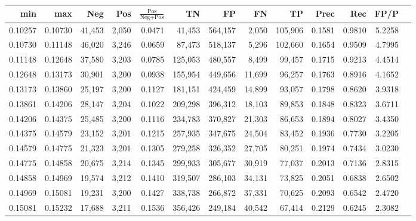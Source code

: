 \begin{tabular}{rrrrrrrrrrrrr}
\toprule
    min &     max &    Neg &   Pos & $\frac{\text{Pos}}{\text{Neg}+\text{Pos}}$ &      TN &      FP &      FN &      TP &   Prec &    Rec &   FP/P \\
\midrule
0.10257 & 0.10730 & 41,453 & 2,050 &                                     0.0471 &  41,453 & 564,157 &   2,050 & 105,906 & 0.1581 & 0.9810 & 5.2258 \\
0.10730 & 0.11148 & 46,020 & 3,246 &                                     0.0659 &  87,473 & 518,137 &   5,296 & 102,660 & 0.1654 & 0.9509 & 4.7995 \\
0.11148 & 0.12648 & 37,580 & 3,203 &                                     0.0785 & 125,053 & 480,557 &   8,499 &  99,457 & 0.1715 & 0.9213 & 4.4514 \\
0.12648 & 0.13173 & 30,901 & 3,200 &                                     0.0938 & 155,954 & 449,656 &  11,699 &  96,257 & 0.1763 & 0.8916 & 4.1652 \\
0.13173 & 0.13860 & 25,197 & 3,200 &                                     0.1127 & 181,151 & 424,459 &  14,899 &  93,057 & 0.1798 & 0.8620 & 3.9318 \\
0.13861 & 0.14206 & 28,147 & 3,204 &                                     0.1022 & 209,298 & 396,312 &  18,103 &  89,853 & 0.1848 & 0.8323 & 3.6711 \\
0.14206 & 0.14375 & 25,485 & 3,200 &                                     0.1116 & 234,783 & 370,827 &  21,303 &  86,653 & 0.1894 & 0.8027 & 3.4350 \\
0.14375 & 0.14579 & 23,152 & 3,201 &                                     0.1215 & 257,935 & 347,675 &  24,504 &  83,452 & 0.1936 & 0.7730 & 3.2205 \\
0.14579 & 0.14775 & 21,323 & 3,201 &                                     0.1305 & 279,258 & 326,352 &  27,705 &  80,251 & 0.1974 & 0.7434 & 3.0230 \\
0.14775 & 0.14858 & 20,675 & 3,214 &                                     0.1345 & 299,933 & 305,677 &  30,919 &  77,037 & 0.2013 & 0.7136 & 2.8315 \\
0.14858 & 0.14969 & 19,574 & 3,212 &                                     0.1410 & 319,507 & 286,103 &  34,131 &  73,825 & 0.2051 & 0.6838 & 2.6502 \\
0.14969 & 0.15081 & 19,231 & 3,200 &                                     0.1427 & 338,738 & 266,872 &  37,331 &  70,625 & 0.2093 & 0.6542 & 2.4720 \\
0.15081 & 0.15232 & 17,688 & 3,211 &                                     0.1536 & 356,426 & 249,184 &  40,542 &  67,414 & 0.2129 & 0.6245 & 2.3082 \\

\end{tabular}
